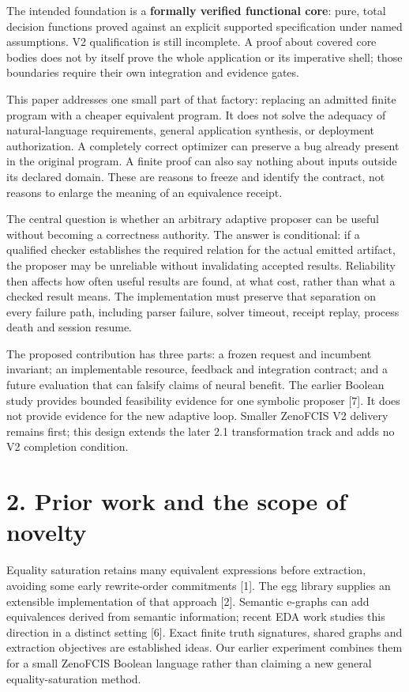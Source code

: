 \documentclass[11pt]{article}
\begin{document}
The intended foundation is a \textbf{formally verified functional core}: pure, total decision functions proved against an explicit supported specification under named assumptions. V2 qualification is still incomplete. A proof about covered core bodies does not by itself prove the whole application or its imperative shell; those boundaries require their own integration and evidence gates.

This paper addresses one small part of that factory: replacing an admitted finite program with a cheaper equivalent program. It does not solve the adequacy of natural-language requirements, general application synthesis, or deployment authorization. A completely correct optimizer can preserve a bug already present in the original program. A finite proof can also say nothing about inputs outside its declared domain. These are reasons to freeze and identify the contract, not reasons to enlarge the meaning of an equivalence receipt.

The central question is whether an arbitrary adaptive proposer can be useful without becoming a correctness authority. The answer is conditional: if a qualified checker establishes the required relation for the actual emitted artifact, the proposer may be unreliable without invalidating accepted results. Reliability then affects how often useful results are found, at what cost, rather than what a checked result means. The implementation must preserve that separation on every failure path, including parser failure, solver timeout, receipt replay, process death and session resume.

The proposed contribution has three parts: a frozen request and incumbent invariant; an implementable resource, feedback and integration contract; and a future evaluation that can falsify claims of neural benefit. The earlier Boolean study provides bounded feasibility evidence for one symbolic proposer [7]. It does not provide evidence for the new adaptive loop. Smaller ZenoFCIS V2 delivery remains first; this design extends the later 2.1 transformation track and adds no V2 completion condition.

\section{2. Prior work and the scope of novelty}

Equality saturation retains many equivalent expressions before extraction, avoiding some early rewrite-order commitments [1]. The egg library supplies an extensible implementation of that approach [2]. Semantic e-graphs can add equivalences derived from semantic information; recent EDA work studies this direction in a distinct setting [6]. Exact finite truth signatures, shared graphs and extraction objectives are established ideas. Our earlier experiment combines them for a small ZenoFCIS Boolean language rather than claiming a new general equality-saturation method.
\end{document}
